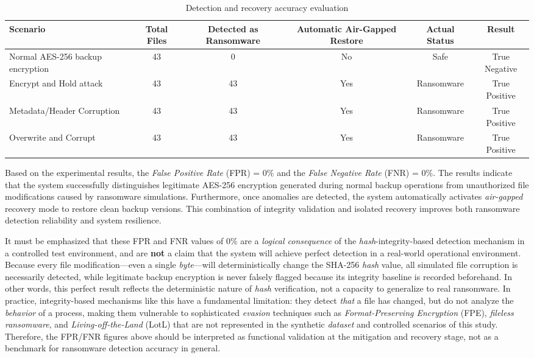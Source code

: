 \documentclass{iaesarticle}
\begin{document}
\begin{table}[H]
\centering
\fontsize{8pt}{10pt}\selectfont
\caption{Detection and recovery accuracy evaluation}
\label{tab:detection_accuracy}
\begin{tabularx}{\textwidth}{@{}X c c c c c@{}}
\hline
\textbf{Scenario} & \textbf{Total Files} & \textbf{Detected as Ransomware} & \textbf{Automatic Air-Gapped Restore} & \textbf{Actual Status} & \textbf{Result} \\
\hline
Normal AES-256 backup encryption & 43 & 0 & No & Safe & True Negative \\
Encrypt and Hold attack & 43 & 43 & Yes & Ransomware & True Positive \\
Metadata/Header Corruption & 43 & 43 & Yes & Ransomware & True Positive \\
Overwrite and Corrupt & 43 & 43 & Yes & Ransomware & True Positive \\
\hline
\end{tabularx}
\end{table}

Based on the experimental results, the \textit{False Positive Rate} (FPR) = 0\% and the \textit{False Negative Rate} (FNR) = 0\%. The results indicate that the system successfully distinguishes legitimate AES-256 encryption generated during normal backup operations from unauthorized file modifications caused by ransomware simulations. Furthermore, once anomalies are detected, the system automatically activates \textit{air-gapped} recovery mode to restore clean backup versions. This combination of integrity validation and isolated recovery improves both ransomware detection reliability and system resilience.

It must be emphasized that these FPR and FNR values of 0\% are a \textit{logical consequence} of the \textit{hash}-integrity-based detection mechanism in a controlled test environment, and are \textbf{not} a claim that the system will achieve perfect detection in a real-world operational environment. Because every file modification---even a single \textit{byte}---will deterministically change the SHA-256 \textit{hash} value, all simulated file corruption is necessarily detected, while legitimate backup encryption is never falsely flagged because its integrity baseline is recorded beforehand. In other words, this perfect result reflects the deterministic nature of \textit{hash} verification, not a capacity to generalize to real ransomware. In practice, integrity-based mechanisms like this have a fundamental limitation: they detect \textit{that} a file has changed, but do not analyze the \textit{behavior} of a process, making them vulnerable to sophisticated \textit{evasion} techniques such as \textit{Format-Preserving Encryption} (FPE), \textit{fileless ransomware}, and \textit{Living-off-the-Land} (LotL) that are not represented in the synthetic \textit{dataset} and controlled scenarios of this study. Therefore, the FPR/FNR figures above should be interpreted as functional validation at the mitigation and recovery stage, not as a benchmark for ransomware detection accuracy in general.
\end{document}
